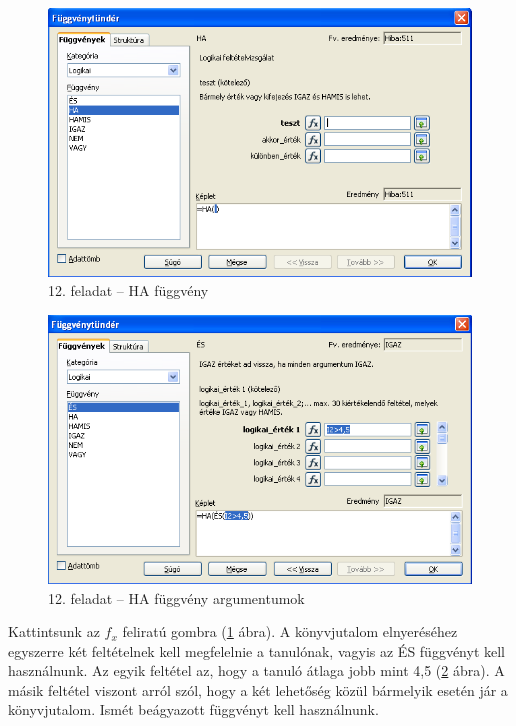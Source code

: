 \begin{figure}[!h]
\begin{center}
\includegraphics[width=13.999cm]{oocalcv2-img68.png}
\caption{12.  feladat --  HA függvény}\label{12-feladatIF}
\end{center}
\end{figure}

\begin{figure}[!h]
\begin{center}
\includegraphics[width=13.999cm]{oocalcv2-img69.png}
\caption{12. feladat --  HA függvény argumentumok}\label{12-feladatArgum}
\end{center}
\end{figure}

Kattintsunk az $f_x$
feliratú gombra (\ref{12-feladatIF} ábra). A könyvjutalom elnyeréséhez
egyszerre két feltételnek kell megfelelnie a tanulónak, vagyis az
ÉS függvényt kell használnunk. Az egyik feltétel az, hogy a
tanuló átlaga jobb mint 4,5 (\ref{12-feladatArgum} ábra). A másik feltétel
viszont arról szól, hogy a két lehetőség közül
bármelyik esetén jár a könyvjutalom. Ismét beágyazott
függvényt kell használnunk.

